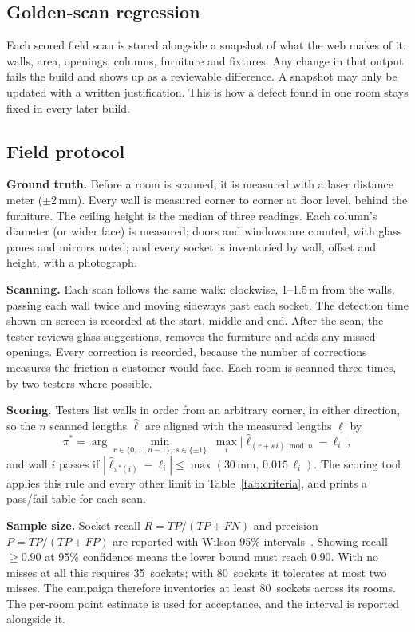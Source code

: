 \documentclass[conference,a4paper,10pt]{IEEEtran}
\begin{document}
\subsection{Golden-scan regression}

Each scored field scan is stored alongside a snapshot of what the web makes
of it: walls, area, openings, columns, furniture and fixtures. Any change in
that output fails the build and shows up as a reviewable difference. A
snapshot may only be updated with a written justification. This is how a
defect found in one room stays fixed in every later build.

\subsection{Field protocol}\label{sec:field}

\textbf{Ground truth.} Before a room is scanned, it is measured with a laser
distance meter ($\pm$2\,mm). Every wall is measured corner to corner at floor
level, behind the furniture. The ceiling height is the median of three
readings. Each column's diameter (or wider face) is measured; doors and
windows are counted, with glass panes and mirrors noted; and every socket is
inventoried by wall, offset and height, with a photograph.

\textbf{Scanning.} Each scan follows the same walk: clockwise, 1--1.5\,m from
the walls, passing each wall twice and moving sideways past each socket. The
detection time shown on screen is recorded at the start, middle and end.
After the scan, the tester reviews glass suggestions, removes the furniture
and adds any missed openings. Every correction is recorded, because the
number of corrections measures the friction a customer would face. Each room
is scanned three times, by two testers where possible.

\textbf{Scoring.} Testers list walls in order from an arbitrary corner, in
either direction, so the $n$ scanned lengths $\hat\ell$ are aligned with the
measured lengths $\ell$ by
\begin{equation}
\pi^{\ast} = \arg\min_{r\in\{0,\dots,n-1\},\; s\in\{\pm1\}}\;
\max_i \bigl|\hat\ell_{(r+s\,i)\bmod n}-\ell_i\bigr|,
\label{eq:align}
\end{equation}
and wall $i$ passes if
$|\hat\ell_{\pi^{\ast}(i)}-\ell_i| \le \max(30\,\text{mm},\,0.015\,\ell_i)$.
The scoring tool applies this rule and every other limit in
Table~\ref{tab:criteria}, and prints a pass/fail table for each scan.

\textbf{Sample size.} Socket recall
$R = \mathit{TP}/(\mathit{TP}+\mathit{FN})$ and precision
$P = \mathit{TP}/(\mathit{TP}+\mathit{FP})$ are reported with Wilson 95\%
intervals~\cite{wilson}. Showing recall $\ge 0.90$ at 95\% confidence means
the lower bound must reach 0.90. With no misses at all this requires
35~sockets; with 80~sockets it tolerates at most two misses. The campaign
therefore inventories at least 80~sockets across its rooms. The per-room
point estimate is used for acceptance, and the interval is reported alongside
it.
\end{document}
